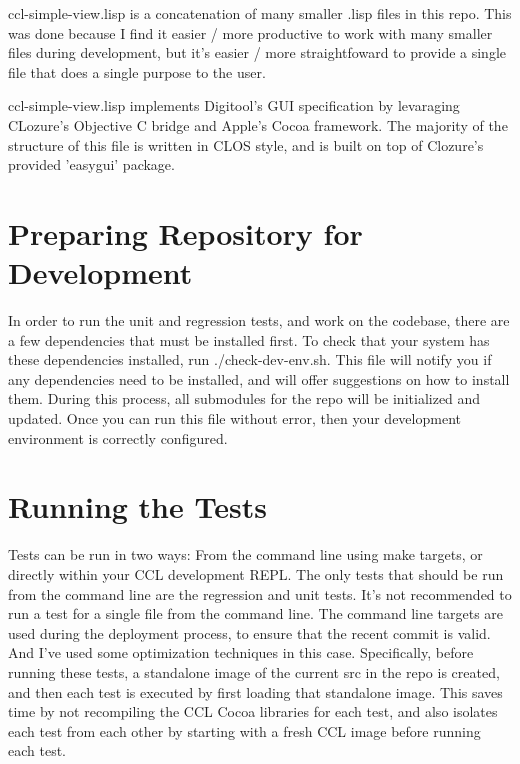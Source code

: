 \documentclass[12pt]{article} %
\begin{document}
ccl-simple-view.lisp is a concatenation of many smaller .lisp files in this repo.
This was done because I find it easier / more productive to work with many smaller files during development, but it's easier / more straightfoward to provide a single file that does a single purpose to the user. 

ccl-simple-view.lisp implements Digitool's GUI specification by levaraging CLozure's Objective C bridge and Apple's Cocoa framework.
The majority of the structure of this file is written in CLOS style, and is built on top of Clozure's provided 'easygui' package. 

\section{Preparing Repository for Development}

In order to run the unit and regression tests, and work on the codebase, there are a few dependencies that must be installed first.
To check that your system has these dependencies installed, run ./check-dev-env.sh.
This file will notify you if any dependencies need to be installed, and will offer suggestions on how to install them.
During this process, all submodules for the repo will be initialized and updated.
Once you can run this file without error, then your development environment is correctly configured.

\section{Running the Tests}

Tests can be run in two ways: From the command line using make targets, or directly within your CCL development REPL.
The only tests that should be run from the command line are the regression and unit tests.
It's not recommended to run a test for a single file from the command line.
The command line targets are used during the deployment process, to ensure that the recent commit is valid.
And I've used some optimization techniques in this case.
Specifically, before running these tests, a standalone image of the current src in the repo is created, and then each test is executed by first loading that standalone image.
This saves time by not recompiling the CCL Cocoa libraries for each test, and also isolates each test from each other by starting with a fresh CCL image before running each test.
\end{document}
